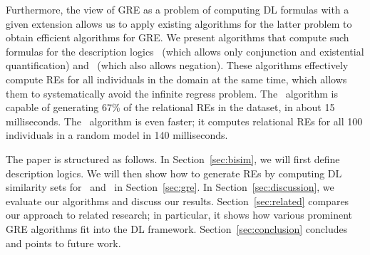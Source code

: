 Furthermore, the view of GRE as a problem of computing DL formulas
with a given extension allows us to apply existing algorithms for the
latter problem to obtain efficient algorithms for GRE.  We present
algorithms that compute such formulas for the description logics \el\
(which allows only conjunction and existential quantification) and
\alc\ (which also allows negation).  These algorithms effectively
compute REs for all individuals in the domain at the same time, which
allows them to systematically avoid the infinite regress problem.  The
\el\ algorithm is capable of generating 67\% of the relational REs in
the \citeA{viethen06:_algor_for_gener_refer_expres} dataset, in about
15 milliseconds.  The \alc\ algorithm is even faster; it computes
relational REs for all 100 individuals in a random model in 140
milliseconds.

The paper is structured as follows.  In Section~\ref{sec:bisim}, we
will first define description logics.  We will then show how to
generate REs by computing DL similarity sets for \alc\ and \el\ in
Section~\ref{sec:gre}.  In Section~\ref{sec:discussion}, we evaluate
our algorithms and discuss our results.  Section~\ref{sec:related}
compares our approach to related research; in particular, it shows how
various prominent GRE algorithms fit into the DL framework.
Section~\ref{sec:conclusion} concludes and points to future work.






